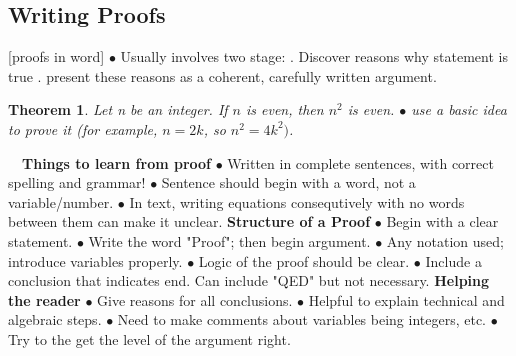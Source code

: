 \documentclass{article}
\newtheorem{theorem}{Theorem}                                       %
\begin{document}
\subsection{Writing Proofs}
[proofs in word]
$\bullet$ Usually involves two stage:
. Discover reasons why statement is true
. present these reasons as a coherent, carefully written argument.
\begin{theorem}
  Let n be an integer. If $n$ is even, then $n^2$ is even.
  \newline
    $\bullet$ use a basic idea to prove it (for example, $n = 2k$, so $n^2 = 4k^2)$.
\end{theorem}
$\text{ }$
\newline
\textbf{Things to learn from proof}
\newline
$\bullet$ Written in complete sentences, with correct spelling and grammar!
\newline
$\bullet$ Sentence should begin with a word, not a variable/number.
\newline
$\bullet$ In text, writing equations consequtively with no words between them can make it unclear.
\newline
\newline
{}
\newline
\newline
{}
\newline
\newline
\textbf{Structure of a Proof}
\newline
$\bullet$ Begin with a clear statement.
\newline
$\bullet$ Write the word "Proof"; then begin argument.
\newline
$\bullet$ Any notation used; introduce variables properly.
\newline
$\bullet$ Logic of the proof should be clear.
\newline
$\bullet$ Include a conclusion that indicates end. Can include "QED" but not necessary.  
\newline
\newline
\textbf{Helping the reader}
\newline
$\bullet$ Give reasons for all conclusions. 
\newline
$\bullet$ Helpful to explain technical and algebraic steps. 
\newline
$\bullet$ Need to make comments about variables being integers, etc.
\newline
$\bullet$ Try to the get the level of the argument right.
\end{document}
